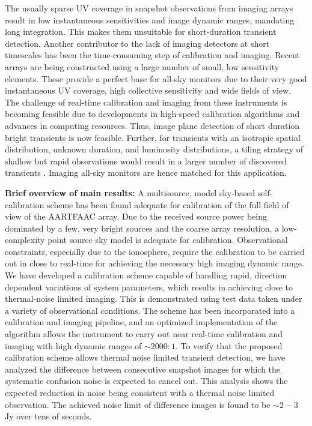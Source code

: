 \documentclass{aa}
\begin{document}
The  usually sparse  UV coverage  in snapshot  observations from  imaging arrays
result in  low instantaneous sensitivities  and image dynamic  ranges, mandating
long  integration.   This makes  them  unsuitable  for short-duration  transient
detection.   Another contributor  to  the  lack of  imaging  detectors at  short
timescales has been  the time-consuming step of calibration  and imaging. Recent
arrays  are being constructed  using a  large number  of small,  low sensitivity
elements. These  provide a perfect base  for all-sky monitors due  to their very
good instantaneous UV  coverage, high collective sensitivity and  wide fields of
view.  The challenge of real-time calibration and imaging from these instruments
is becoming  feasible due to  developments in high-speed  calibration algorithms
and  advances in  computing resources.   Thus,  image plane  detection of  short
duration  bright transients  is now  feasible. Further,  for transients  with an
isotropic spatial distribution,  unknown duration, and luminosity distributions,
a tiling  strategy of shallow  but rapid observations  would result in  a larger
number  of  discovered transients  \citep  {nemiroff2003tile}.  Imaging  all-sky
monitors are hence matched for this application.


\textbf{Brief  overview  of  main  results:}  A  multisource,  model  sky-based
self-calibration  scheme has  been found  adequate for  calibration of  the full
field of  view of the  AARTFAAC array.  Due  to the received source  power being
dominated by a few, very bright  sources and the coarse array resolution,
a  low-complexity   point  source  sky   model  is  adequate   for  calibration.
Observational  constraints,  especially  due   to  the  ionosphere,  require  the
calibration to be carried out in  close to real-time for achieving the necessary
high imaging dynamic  range.  We have developed a  calibration scheme capable of
handling  rapid,  direction dependent  variations  of  system parameters,  which
results  in  achieving   close  to  thermal-noise  limited   imaging.  This  is
demonstrated using test data taken  under a variety of observational conditions.
The scheme has been incorporated into a calibration and imaging pipeline, and an
optimized implementation  of the  algorithm allows the  instrument to  carry out
near real-time calibration and imaging  with high dynamic ranges of $\sim$$2000:1$.  To
verify  that  the  proposed  calibration  scheme allows  thermal  noise  limited
transient  detection,  we  have  analyzed  the  difference  between  consecutive
snapshot images for  which the systematic confusion noise  is expected to cancel
out. This analysis shows the expected reduction in noise being consistent with a
thermal noise limited observation. The achieved noise limit of difference images
is found to be $\sim$$2-3$ Jy over tens of seconds.
 
\end{document}

